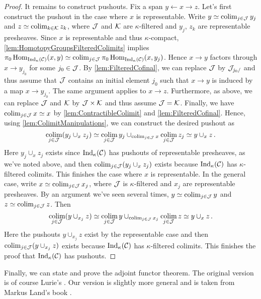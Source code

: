\begin{proof}
	It remains to construct pushouts. Fix a span $y\leftarrow x\rightarrow z$. Let's first construct the pushout in the case where $x$ is representable. Write $y\simeq \operatorname*{colim}_{j\in\mathcal{J}} y_j$ and $z\simeq \operatorname*{colim}_{k\in\mathcal{K}}z_k$, where $\mathcal{J}$ and $\mathcal{K}$ are $\kappa$-filtered and $y_j$, $z_k$ are representable presheaves. Since $x$ is representable and thus $\kappa$-compact, \cref{lem:HomotopyGroupsFilteredColimits} implies  $\pi_0\operatorname{Hom}_{\mathrm{Ind}_\kappa(\mathcal{C})}(x,y)\simeq \operatorname*{colim}_{j\in\mathcal{J}}\pi_0\operatorname{Hom}_{\mathrm{Ind}_\kappa(\mathcal{C})}(x,y_j)$. Hence $x\rightarrow y$ factors through $x\rightarrow y_{j_0}$ for some $j_0\in \mathcal{J}$. By \cref{lem:FilteredCofinal}, we can replace $\mathcal{J}$ by $\mathcal{J}_{j_0/}$ and thus assume that $\mathcal{J}$ contains an initial element $j_0$ such that $x\rightarrow y$ is induced by a map $x\rightarrow y_{j_0}$. The same argument applies to $x\rightarrow z$. Furthermore, as above, we can replace $\mathcal{J}$ and $\mathcal{K}$ by $\mathcal{J}\times \mathcal{K}$ and thus assume $\mathcal{J}=\mathcal{K}$. Finally, we have $\operatorname*{colim}_{j\in\mathcal{J}}x\simeq x$ by \cref{lem:ContractibleColimit} and \cref{lem:FilteredCofinal}. Hence, using \cref{lem:ColimitManipulations}, we can construct the desired pushout as
	\begin{equation*}
		\operatorname*{colim}_{j\in\mathcal{J}}(y_j\cup_xz_j)\simeq \operatorname*{colim}_{j\in \mathcal{J}}y_j\cup_{\operatorname*{colim}_{j\in\mathcal{J}}x}\operatorname*{colim}_{j\in\mathcal{J}}z_j\simeq y\cup_xz\,.
	\end{equation*}
	Here $y_j\cup_xz_j$ exists since $\mathrm{Ind}_\kappa(\mathcal{C})$ has pushouts of representable presheaves, as we've noted above, and then $\operatorname*{colim}_{j\in\mathcal{J}}(y_j\cup_xz_j)$ exists because $\mathrm{Ind}_\kappa(\mathcal{C})$ has $\kappa$-filtered colimits. This finishes the case where $x$ is representable. In the general case, write $x\simeq\operatorname*{colim}_{j\in\mathcal{J}}x_j$, where $\mathcal{J}$ is $\kappa$-filtered and $x_j$ are representable presheaves. By an argument we've seen several times, $y\simeq \operatorname*{colim}_{j\in\mathcal{J}}y$ and $z\simeq \operatorname*{colim}_{j\in\mathcal{J}}z$. Then
	\begin{equation*}
		\operatorname*{colim}_{j\in\mathcal{J}}(y\cup_{x_j}z)\simeq \operatorname*{colim}_{j\in \mathcal{J}}y\cup_{\operatorname*{colim}_{j\in\mathcal{J}}x_j}\operatorname*{colim}_{j\in\mathcal{J}}z\simeq y\cup_xz\,.
	\end{equation*}
	Here the pushouts $y\cup_{x_j}z$ exist by the representable case and then $\operatorname*{colim}_{j\in\mathcal{J}}(y\cup_{x_j}z)$ exists because $\mathrm{Ind}_\kappa(\mathcal{C})$ has $\kappa$-filtered colimits. This finishes the proof that $\mathrm{Ind}_\kappa(\mathcal{C})$ has pushouts.
\end{proof}
Finally, we can state and prove the adjoint functor theorem. The original version is of course Lurie's \cite[Corollary~]{HTT}. Our version is slightly more general and is taken from Markus Land's book \cite[Theorems~5.2.2 and~5.2.14]{Land}. %
